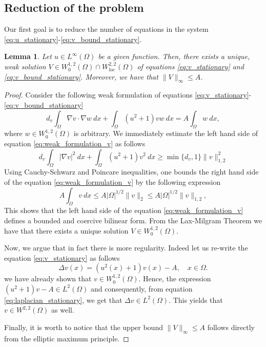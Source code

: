\documentclass[12pt, a4paper]{article}
\theoremstyle{break}
\theoremstyle{break}
\theoremstyle{break}
\theoremstyle{break}
\theoremstyle{break}
\newtheorem{lem}{Lemma}[section]
\theoremstyle{break}
\theoremstyle{break}
\begin{document}
\subsection{Reduction of the problem} Our first goal is to reduce the number of equations in the system \eqref{eq:u_stationary}-\eqref{eq:v_bound_stationary}.
\begin{lem}
    \label{lem:existence_of_inhomogeneous_elliptic_v}
    Let $u \in L^\infty(\Omega)$ be a given function. Then, there exists a unique, weak solution $V \in W^{1,2}_0(\Omega) \cap W^{2,2}_{loc}(\Omega)$ of equations \eqref{eq:v_stationary} and \eqref{eq:v_bound_stationary}. Moreover, we have that $\|V \|_\infty \leq A$.
\end{lem}
\begin{proof}
    Consider the following weak formulation of equations \eqref{eq:v_stationary}-\eqref{eq:v_bound_stationary}
    \begin{equation}
        \label{eq:weak_formulation_v}
        d_v\int_\Omega\nabla v \cdot \nabla w \:dx + \int_\Omega (u^2 + 1) v w\:dx = A \int_\Omega w \:dx,
    \end{equation}
    where $w \in W^{1,2}_0(\Omega)$ is arbitrary. We immediately estimate the left hand side of equation \eqref{eq:weak_formulation_v} as follows
    \begin{equation}
        \label{eq:coercivity_bilinear_form_v}
        d_v\int_\Omega | \nabla v |^2 \:dx + \int_\Omega (u^2 + 1) v^2\:dx \geq \min\{d_v, 1\} \|v\|_{1,2}^2
    \end{equation}
    Using Cauchy-Schwarz and Poincare inequalities, one bounds the right hand side of the equation \eqref{eq:weak_formulation_v} by the following expression
    \begin{equation}
        \label{eq:boundedness_bilinear_form_v}
        A \int_\Omega v \:dx \leq A |\Omega|^{1/2} \|v\|_2 \leq A |\Omega|^{1/2} \|v\|_{1,2},
    \end{equation}
    This shows that the left hand side of the equation \eqref{eq:weak_formulation_v} defines a bounded and coercive bilinear form. From the Lax-Milgram Theorem we have that there exists a unique solution $V \in W^{1,2}_0(\Omega)$. 

    Now, we argue that in fact there is more regularity. Indeed let us re-write the equation \eqref{eq:v_stationary} as follows
    \begin{equation}
        \label{eq:laplacian_stationary}
        \Delta v (x) = (u^2(x) + 1) v(x)  - A, \quad x \in \Omega.
    \end{equation}
    we have already shown that $v \in W^{1,2}_0(\Omega)$. Hence, the expression $(u^2 + 1)v - A \in L^2(\Omega)$ and consequently, from equation \eqref{eq:laplacian_stationary}, we get that $\Delta v \in L^2(\Omega)$. This yields that $v \in W^{2,2}(\Omega)$ as well.
    
    Finally, it is worth to notice that the upper bound $\|V\|_\infty \leq A$ follows directly from the elliptic maximum principle.
\end{proof}
\end{document}
